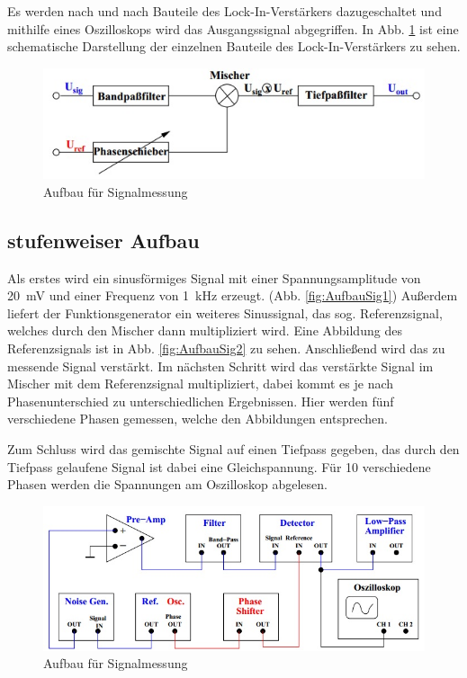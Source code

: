 Es werden nach und nach Bauteile des Lock-In-Verstärkers dazugeschaltet
und mithilfe eines Oszilloskops wird das Ausgangssignal abgegriffen. In Abb. \ref{fig:Schema} ist eine schematische Darstellung der einzelnen Bauteile des Lock-In-Verstärkers zu sehen.

\begin{figure}[h]
       \includegraphics[scale=0.8]{Grafiken/V303Schema.jpg}
       \caption{Aufbau für Signalmessung}
       \label{fig:Schema}
\end{figure}

\subsection{stufenweiser Aufbau}

Als erstes wird ein sinusförmiges Signal mit einer Spannungsamplitude
von \SI{20}{\milli\volt} und einer Frequenz von \SI{1}{\kilo\hertz} erzeugt. (Abb. \cref{fig:AufbauSig1}) Außerdem liefert der Funktionsgenerator ein weiteres Sinussignal, das sog. Referenzsignal, welches durch den Mischer dann multipliziert wird. Eine Abbildung des Referenzsignals ist in Abb. \cref{fig:AufbauSig2} zu sehen. Anschließend wird das zu messende Signal verstärkt. Im nächsten Schritt wird das verstärkte Signal im Mischer mit dem Referenzsignal multipliziert, dabei kommt es je nach Phasenunterschied zu unterschiedlichen Ergebnissen. Hier werden fünf verschiedene Phasen gemessen, welche den Abbildungen  entsprechen.

Zum Schluss wird das gemischte Signal auf einen Tiefpass gegeben, das durch den Tiefpass gelaufene Signal ist dabei eine Gleichspannung. Für 10 verschiedene Phasen werden die Spannungen am Oszilloskop abgelesen.

\begin{figure}[h]
       \includegraphics[scale=0.8]{Grafiken/V303Aufbau1.jpg}
       \caption{Aufbau für Signalmessung}
       \label{fig:Aufbau1}
\end{figure}

